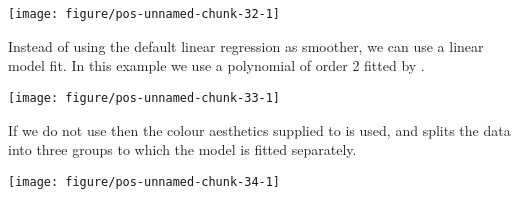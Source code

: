 \documentclass[paper=a4,10pt,div=17,headsepline,BCOR=12mm,twoside,open=right]{scrbook}\usepackage{knitr}
\begin{document}
\begin{knitrout}\footnotesize
{}\color{fgcolor}\begin{kframe}
\begin{alltt}
 \hlopt{+} \hlstd{(}\hlstd{=}\hlstd{,} \hlstd{=}\hlstd{)}
\end{alltt}
\end{kframe}

{\centering \texttt{[image: figure/pos-unnamed-chunk-32-1]} 

}



\end{knitrout}

Instead of using the default linear regression as smoother, we can use a linear model fit. In this example we use a polynomial of order 2 fitted by .

\begin{knitrout}\footnotesize
{}\color{fgcolor}\begin{kframe}
\begin{alltt}
 \hlopt{+} \hlstd{(}\hlstd{=}\hlstd{,} \hlopt{~}\hlstd{),} \hlstd{=}\hlstd{)}
\end{alltt}
\end{kframe}

{\centering \texttt{[image: figure/pos-unnamed-chunk-33-1]} 

}



\end{knitrout}

If we do not use  then the colour aesthetics supplied to  is used, and splits the data into three groups to which the model is fitted separately.

\begin{knitrout}\footnotesize
{}\color{fgcolor}\begin{kframe}
\begin{alltt}
 \hlopt{+} \hlstd{(}\hlstd{=}\hlstd{)}
\end{alltt}
\end{kframe}

{\centering \texttt{[image: figure/pos-unnamed-chunk-34-1]} 

}



\end{knitrout}
\end{document}
